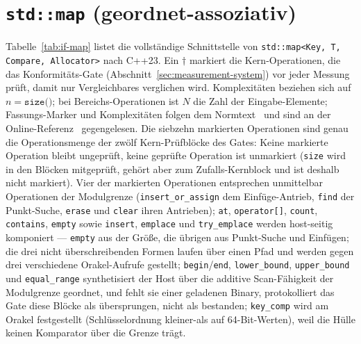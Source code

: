 \section{\texttt{std::map} (geordnet-assoziativ)}\label{asec:if-map}
Tabelle~\ref{tab:if-map} listet die vollständige Schnittstelle von
\texttt{std::map<Key,\,T,\,Compare,\,Allocator>} nach C++23. Ein $\dagger$ markiert die
Kern-Operationen, die das Konformitäts-Gate (Abschnitt~\ref{sec:measurement-system}) vor jeder
Messung prüft, damit nur Vergleichbares verglichen wird. Komplexitäten beziehen sich auf
$n=\texttt{size()}$; bei Bereichs-Operationen ist $N$ die Zahl der Eingabe-Elemente; Fassungs-Marker
und Komplexitäten folgen dem Normtext~\cite{iso_cpp} und sind an der
Online-Referenz~\cite{cppreference_map} gegengelesen. Die siebzehn markierten Operationen sind
genau die Operationsmenge der zwölf Kern-Prüfblöcke des Gates: Keine markierte Operation bleibt
ungeprüft, keine geprüfte Operation ist unmarkiert (\texttt{size} wird in den Blöcken mitgeprüft,
gehört aber zum Zufalls-Kernblock und ist deshalb nicht markiert). Vier der markierten Operationen
entsprechen unmittelbar Operationen der Modulgrenze (\texttt{insert\_or\_assign} dem
Einfüge-Antrieb, \texttt{find} der Punkt-Suche, \texttt{erase} und \texttt{clear} ihren Antrieben);
\texttt{at}, \texttt{operator[]}, \texttt{count}, \texttt{contains}, \texttt{empty} sowie
\texttt{insert}, \texttt{emplace} und \texttt{try\_emplace} werden host-seitig komponiert ---
\texttt{empty} aus der Größe, die übrigen aus Punkt-Suche und Einfügen; die drei nicht
überschreibenden Formen laufen über einen Pfad und werden gegen drei verschiedene Orakel-Aufrufe
gestellt; \texttt{begin}/\texttt{end}, \texttt{lower\_bound}, \texttt{upper\_bound} und
\texttt{equal\_range} synthetisiert der Host über die additive Scan-Fähigkeit der Modulgrenze
geordnet, und fehlt sie einer geladenen Binary, protokolliert das Gate diese Blöcke als
übersprungen, nicht als bestanden; \texttt{key\_comp} wird am Orakel festgestellt (Schlüsselordnung
kleiner-als auf 64-Bit-Werten), weil die Hülle keinen Komparator über die Grenze trägt.

